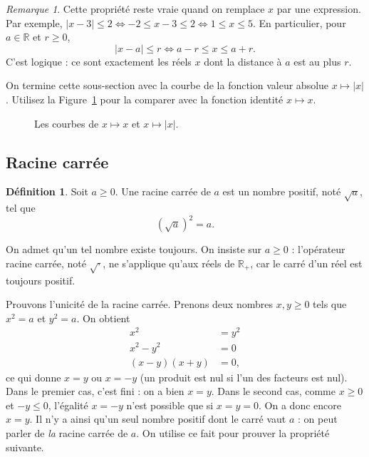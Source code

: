 \documentclass[12pt,a4paper]{article}
\theoremstyle{plain}
\theoremstyle{definition}
\newtheorem{definition}[theorem]{Définition}
\theoremstyle{remark}
\newtheorem*{remark}{Remarque}
\begin{document}
\begin{remark}
  Cette propriété reste vraie quand on remplace $x$ par une expression. Par exemple,
  $\lvert x - 3 \rvert \le 2 \Longleftrightarrow -2 \le x - 3 \le 2
  \Longleftrightarrow 1 \le x \le 5$. En particulier, pour $a \in \mathbb{R}$ et
  $r \ge 0$,
  \[
  \lvert x - a \rvert \le r \Longleftrightarrow a - r \le x \le a + r.
  \]
  C'est logique : ce sont exactement les réels $x$ dont la distance à $a$ est
  au plus $r$.
\end{remark}

On termine cette sous-section avec la courbe de la fonction valeur absolue
$x \mapsto \lvert x \rvert$. Utilisez la Figure~\ref{fig:abs_func} pour la comparer
avec la fonction identité $x \mapsto x$.

\begin{figure}[ht]
  \centering
  \caption{Les courbes de $x \mapsto x$ et $x \mapsto \lvert x \rvert$.}
  \label{fig:abs_func}
\end{figure}

\subsection{Racine carrée}

\begin{tcolorbox}[navybar]
  \begin{definition}
    Soit $a \ge 0$. Une racine carrée de $a$ est un nombre positif, noté
    $\sqrt{a}$, tel que
    \[
    (\sqrt{a})^2 = a.
    \]
  \end{definition}
\end{tcolorbox}

On admet qu'un tel nombre existe toujours. On insiste sur $a \ge 0$ : l'opérateur
racine carrée, noté $\sqrt{\cdot}$, ne s'applique qu'aux réels de $\mathbb{R}_+$,
car le carré d'un réel est toujours positif.

Prouvons l'unicité de la racine carrée. Prenons deux nombres $x, y \ge 0$ tels que
$x^2 = a$ et $y^2 = a$. On obtient
\[
\begin{aligned}
  x^2 &= y^2 \\
  x^2 - y^2 &= 0 \\
  (x - y)(x + y) &= 0,
\end{aligned}
\]
ce qui donne $x = y$ ou $x = -y$ (un produit est nul si l'un des facteurs est nul).
Dans le premier cas, c'est fini : on a bien $x = y$. Dans le second cas, comme
$x \ge 0$ et $-y \le 0$, l'égalité $x = -y$ n'est possible que si $x = y = 0$.
On a donc encore $x = y$. Il n'y a ainsi qu'un seul nombre positif dont le carré
vaut $a$ : on peut parler de \textit{la} racine carrée de $a$. On utilise ce fait
pour prouver la propriété suivante.
\end{document}
